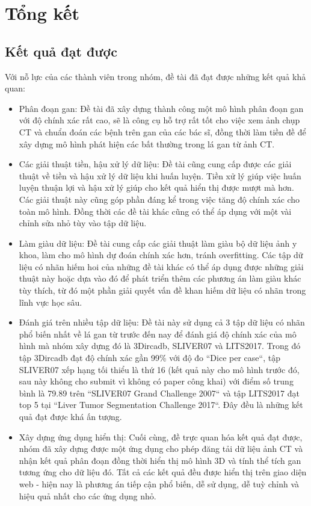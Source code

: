\chapter{Tổng kết}
\section{Kết quả đạt được}
Với nỗ lực của các thành viên trong nhóm, đề tài đã đạt được những kết quả khả quan:
\begin{itemize}
    \item Phân đoạn gan: Đề tài đã xây dựng thành công một mô hình phân đoạn gan với độ chính xác rất cao, sẽ là công cụ hỗ trợ rất tốt cho việc xem ảnh chụp CT và chuẩn đoán các bệnh trên gan của các bác sĩ, đồng thời làm tiền đề để xây dựng mô hình phát hiện các bất thường trong lá gan từ ảnh CT.
    \item Các giải thuật tiền, hậu xử lý dữ liệu: Đề tài cũng cung cấp được các giải thuật về tiền và hậu xử lý dữ liệu khi huấn luyện. Tiền xử lý giúp việc huấn luyện thuận lợi và hậu xử lý giúp cho kết quả hiển thị được mượt mà hơn. Các giải thuật này cũng góp phần đáng kể trong việc tăng độ chính xác cho toàn mô hình. Đồng thời các đề tài khác cũng có thể áp dụng với một vài chỉnh sửa nhỏ tùy vào tập dữ liệu.
    \item Làm giàu dữ liệu: Đề tài cung cấp các giải thuật làm giàu bộ dữ liệu ảnh y khoa, làm cho mô hình dự đoán chính xác hơn, tránh overfitting. Các tập dữ liệu có nhãn hiếm hoi của những đề tài khác có thể áp dụng được những giải thuật này hoặc dựa vào đó để phát triển thêm các phương án làm giàu khác tùy thích, từ đó một phần giải quyết vấn đề khan hiếm dữ liệu có nhãn trong lĩnh vực học sâu.
    \item Đánh giá trên nhiều tập dữ liệu: Đề tài này sử dụng cả 3 tập dữ liệu có nhãn phổ biến nhất về lá gan từ trước đến nay để đánh giá độ chính xác của mô hình mà nhóm xây dựng đó là 3Dircadb, SLIVER07 và LITS2017. Trong đó tập 3Dircadb đạt độ chính xác gần 99\% với độ đo ``Dice per case``, tập SLIVER07 xếp hạng tối thiểu là thứ 16 (kết quả này cho mô hình trước đó, sau này không cho submit vì không có paper công khai) với điểm số trung bình là 79.89 trên ``SLIVER07 Grand Challenge 2007`` và tập LITS2017 đạt top 5 tại ``Liver Tumor Segmentation Challenge 2017``. Đây đều là những kết quả đạt được khá ấn tượng.
    \item Xây dựng ứng dụng hiển thị: Cuối cùng, đề trực quan hóa kết quả đạt được, nhóm đã xây dựng được một ứng dụng cho phép đăng tải dữ liệu ảnh CT và nhận kết quả phân đoạn đồng thời hiển thị mô hình 3D và tính thể tích gan tương ứng cho dữ liệu đó. Tất cả các kết quả đều được hiển thị trên giao diện web - hiện nay là phương án tiếp cận phổ biến, dễ sử dụng, dễ tuỳ chỉnh và hiệu quả nhất cho các ứng dụng nhỏ.
\end{itemize}
